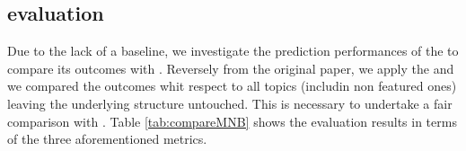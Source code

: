 \subsection{\MNB evaluation} \label{sec:EXP2}

\rqsecond

Due to the lack of a baseline, we investigate the prediction performances of the \MNB to compare its outcomes with \CT. Reversely from the original paper, we apply the \MNB and we compared the outcomes whit respect to all topics (includin non featured ones) leaving the underlying structure untouched. This is necessary to undertake a fair comparison with \CT. Table \ref{tab:compareMNB} shows the evaluation results in terms  of the three aforementioned metrics. 


%
%
